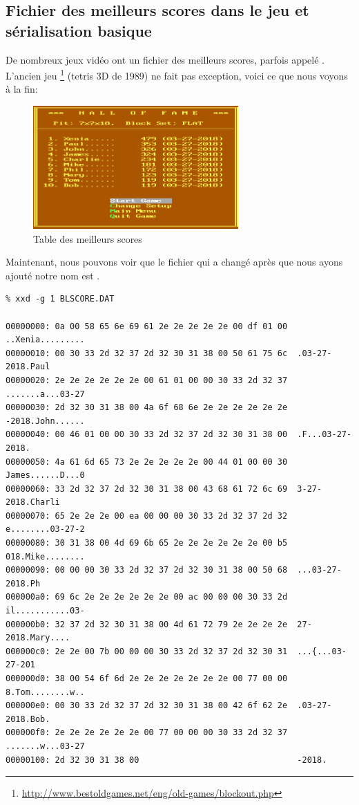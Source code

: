 \subsection{Fichier des meilleurs scores dans le jeu  et sérialisation basique}

De nombreux jeux vidéo ont un fichier des meilleurs scores, parfois appelé .
L'ancien jeu \footnote{\url{http://www.bestoldgames.net/eng/old-games/blockout.php}}
(tetris 3D de 1989) ne fait pas exception, voici ce que nous voyons à la fin:

\begin{figure}[H]
\centering
\includegraphics[width=0.7\textwidth]{advanced/550_more_structs/blockout/hs.png}
\caption{Table des meilleurs scores}
\end{figure}

Maintenant, nous pouvons voir que le fichier qui a changé après que nous ayons ajouté
notre nom est .

\begin{lstlisting}
% xxd -g 1 BLSCORE.DAT

00000000: 0a 00 58 65 6e 69 61 2e 2e 2e 2e 2e 00 df 01 00  ..Xenia.........
00000010: 00 30 33 2d 32 37 2d 32 30 31 38 00 50 61 75 6c  .03-27-2018.Paul
00000020: 2e 2e 2e 2e 2e 2e 00 61 01 00 00 30 33 2d 32 37  .......a...03-27
00000030: 2d 32 30 31 38 00 4a 6f 68 6e 2e 2e 2e 2e 2e 2e  -2018.John......
00000040: 00 46 01 00 00 30 33 2d 32 37 2d 32 30 31 38 00  .F...03-27-2018.
00000050: 4a 61 6d 65 73 2e 2e 2e 2e 2e 00 44 01 00 00 30  James......D...0
00000060: 33 2d 32 37 2d 32 30 31 38 00 43 68 61 72 6c 69  3-27-2018.Charli
00000070: 65 2e 2e 2e 00 ea 00 00 00 30 33 2d 32 37 2d 32  e........03-27-2
00000080: 30 31 38 00 4d 69 6b 65 2e 2e 2e 2e 2e 2e 00 b5  018.Mike........
00000090: 00 00 00 30 33 2d 32 37 2d 32 30 31 38 00 50 68  ...03-27-2018.Ph
000000a0: 69 6c 2e 2e 2e 2e 2e 2e 00 ac 00 00 00 30 33 2d  il...........03-
000000b0: 32 37 2d 32 30 31 38 00 4d 61 72 79 2e 2e 2e 2e  27-2018.Mary....
000000c0: 2e 2e 00 7b 00 00 00 30 33 2d 32 37 2d 32 30 31  ...{...03-27-201
000000d0: 38 00 54 6f 6d 2e 2e 2e 2e 2e 2e 2e 00 77 00 00  8.Tom........w..
000000e0: 00 30 33 2d 32 37 2d 32 30 31 38 00 42 6f 62 2e  .03-27-2018.Bob.
000000f0: 2e 2e 2e 2e 2e 2e 00 77 00 00 00 30 33 2d 32 37  .......w...03-27
00000100: 2d 32 30 31 38 00                                -2018.
\end{lstlisting}

